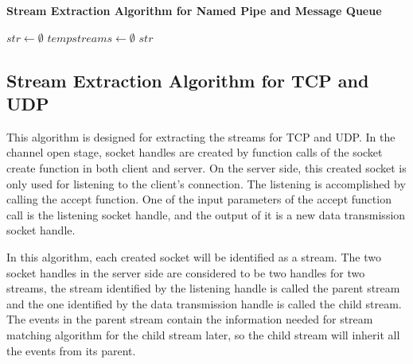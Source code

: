 \begin{algorithm}[H]
\DontPrintSemicolon
\caption{{\bf Stream Extraction Algorithm for Named Pipe and Message Queue} \label{streamext1}}
$str \leftarrow \emptyset$\; 
$tempstreams \leftarrow \emptyset$\;
\KwRet $str$\;
\end{algorithm} 

\subsection{Stream Extraction Algorithm for TCP and UDP}
This algorithm is designed for extracting the streams for TCP and UDP. In the channel open stage, socket handles are created by function calls of the socket create function in both client and server. On the server side, this created socket is only used for listening to the client's connection. The listening is accomplished by calling the accept function. One of the input parameters of the accept function call is the listening socket handle, and the output of it is a new data transmission socket handle. 


In this algorithm, each created socket will be identified as a stream. The two socket handles in the server side are considered to be two handles for two streams, the stream identified by the listening handle is called the parent stream and the one identified by the data transmission handle is called the child stream. The events in the parent stream contain the information needed for stream matching algorithm for the child stream later, so the child stream will inherit all the events from its parent. 

